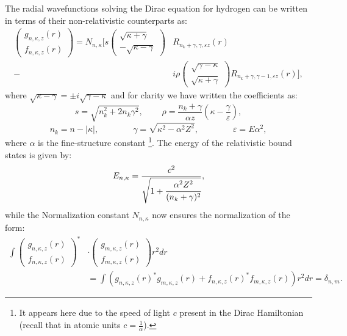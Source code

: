 The radial wavefunctions solving the Dirac equation for hydrogen can be written in terms of their non-relativistic counterparts as:
\begin{align} \label{DiracRadialWafunctions}
\left(\begin{matrix}g_{n,\kappa,z}(r)  \\ f_{n,\kappa,z}(r)\end{matrix}\right) = N_{n,\kappa}\Big[s \left(\begin{matrix}\sqrt{\kappa+\gamma}  \\-\sqrt{\kappa-\gamma}\end{matrix}\right) &R_{n_k+\gamma,\gamma,\varepsilon z}(r) \nonumber \\
-&i \rho \left(\begin{matrix}\sqrt{\gamma-\kappa}  \\\sqrt{\kappa+\gamma}\end{matrix}\right) R_{n_k + \gamma,\gamma-1,\varepsilon z}(r)\Big],
\end{align}
where $\sqrt{\kappa-\gamma} = \pm i \sqrt{\gamma-\kappa}$ and for clarity we have written the coefficients as:
\begin{equation}
s=\sqrt{n_k^2 + 2n_k \gamma^2},~~~~~~~~~~\rho =\frac{n_k + \gamma}{\alpha z}\left(\kappa- \frac{\gamma}{\varepsilon}\right),
\end{equation}
\begin{equation}\label{nkdef}
  n_k = n - |\kappa|, \qquad \qquad \gamma = \sqrt{\kappa^2-\alpha^2 Z^2}, \qquad \qquad \varepsilon =E\alpha^2,
  \end{equation}
  where $\alpha$ is the fine-structure constant \footnote{It appears here due to the speed of light $c$ present in the Dirac Hamiltonian (recall that in atomic units $c=\frac{1}{\alpha}$).}.
The energy of the relativistic bound states is given by:
\begin{equation}\label{DiracEnergy}
	E_{n,\kappa}=\frac{c^2}{\sqrt{1+\cfrac{\alpha^2 Z^2}{(n_k+\gamma)^2}}},
\end{equation}
while the Normalization constant $N_{n,\kappa}$ now ensures the normalization of the form:
\begin{align}
    \int \left(\begin{matrix}g_{n,\kappa,z}(r)  \\ f_{n,\kappa,z}(r)\end{matrix}\right)^*&\cdot \left(\begin{matrix}g_{m,\kappa,z}(r)  \\ f_{m,\kappa,z}(r)\end{matrix}\right) r^2 dr \nonumber
    \\
    &= \int \left(g_{n,\kappa,z}(r)^* g_{m,\kappa,z}(r) +f_{n,\kappa,z}(r)^*f_{m,\kappa,z}(r) \right)r^2dr = \delta_{n,m}.
\end{align}

